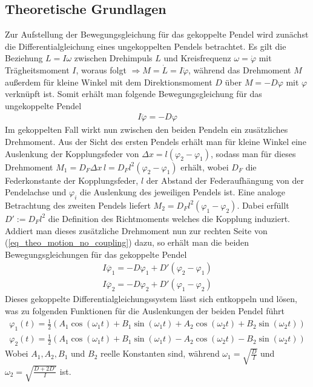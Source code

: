 \documentclass[12pt,a4paper,german]{scrartcl}
\numberwithin{equation}{section}
\begin{document}
  \subsection{Theoretische Grundlagen}
  Zur Aufstellung der Bewegungsgleichung für das gekoppelte Pendel wird zunächst die Differentialgleichung eines ungekoppelten Pendels betrachtet.
  Es gilt die Beziehung $L = I \omega$ zwischen Drehimpuls $L$ und Kreisfrequenz $\omega = \dot{\varphi}$ mit Trägheitsmoment $I$, woraus folgt $\Rightarrow M = \dot{L} = I \ddot{\varphi}$, während das Drehmoment $M$ außerdem für kleine Winkel mit dem Direktionsmoment $D$ über $M = -D \varphi$ mit $\varphi$ verknüpft ist.
  Somit erhält man folgende Bewegungsgleichung für das ungekoppelte Pendel
  \begin{align}
    I \ddot{\varphi} = -D \varphi
    \label{eq_theo_motion_no_coupling}
  \end{align}
  Im gekoppelten Fall wirkt nun zwischen den beiden Pendeln ein zusätzliches Drehmoment.
  Aus der Sicht des ersten Pendels erhält man für kleine Winkel eine Auslenkung der Kopplungsfeder von $\Delta x = l (\varphi_2 - \varphi_1)$, sodass man für dieses Drehmoment $M_1 = D_F \Delta x \, l = D_F l^2 (\varphi_2 - \varphi_1)$ erhält, wobei $D_F$ die Federkonstante der Kopplungsfeder, $l$ der Abstand der Federaufhängung von der Pendelachse und $\varphi_i$ die Auslenkung des jeweiligen Pendels ist.
  Eine analoge Betrachtung des zweiten Pendels liefert $M_2 = D_F l^2 (\varphi_1 - \varphi_2)$.
  Dabei erfüllt $D' := D_F l^2$ die Definition des Richtmoments welches die Kopplung induziert.
  Addiert man dieses zusätzliche Drehmoment nun zur rechten Seite von (\ref{eq_theo_motion_no_coupling}) dazu, so erhält man die beiden Bewegungsgleichungen für das gekoppelte Pendel
  \begin{align}
    I \ddot{\varphi_1} = -D \varphi_1 + D' (\varphi_2 - \varphi_1) \nonumber \\
    I \ddot{\varphi_2} = -D \varphi_2 + D' (\varphi_1 - \varphi_2)
    \label{eq_theo_motion_coupling}
  \end{align}
  Dieses gekoppelte Differentialgleichungssystem lässt sich entkoppeln und lösen, was zu folgenden Funktionen für die Auslenkungen der beiden Pendel führt
  \begin{align}
    \varphi_1(t) = \frac{1}{2} (A_1 \cos(\omega_1 t) + B_1 \sin(\omega_1 t) + A_2 \cos(\omega_2 t) + B_2 \sin(\omega_2 t)) \nonumber \\
    \varphi_2(t) = \frac{1}{2} (A_1 \cos(\omega_1 t) + B_1 \sin(\omega_1 t) - A_2 \cos(\omega_2 t) - B_2 \sin(\omega_2 t))
    \label{eq_theo_motion_solution}
  \end{align}
  Wobei $A_1, A_2, B_1$ und $B_2$ reelle Konstanten sind, während $\omega_1 = \sqrt{\frac{D}{I}}$ und $\omega_2 = \sqrt{\frac{D + 2 D'}{I}}$ ist.
\end{document}
